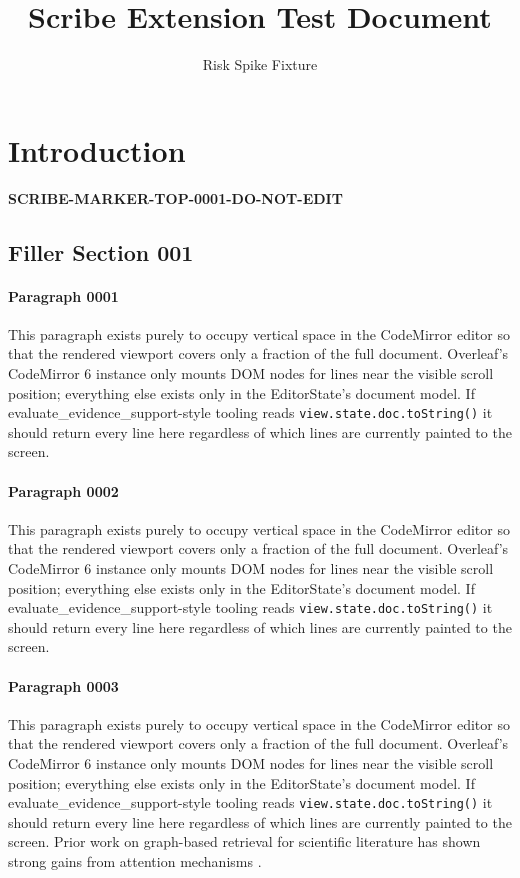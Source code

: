 \documentclass{article}
\title{Scribe Extension Test Document}
\author{Risk Spike Fixture}
\begin{document}
\maketitle

\section{Introduction}
\textbf{SCRIBE-MARKER-TOP-0001-DO-NOT-EDIT}

\subsection{Filler Section 001}
\paragraph{Paragraph 0001}
This paragraph exists purely to occupy vertical space in the CodeMirror editor so that the rendered viewport covers only a fraction of the full document. Overleaf's CodeMirror 6 instance only mounts DOM nodes for lines near the visible scroll position; everything else exists only in the EditorState's document model. If evaluate\_evidence\_support-style tooling reads \texttt{view.state.doc.toString()} it should return every line here regardless of which lines are currently painted to the screen.

\paragraph{Paragraph 0002}
This paragraph exists purely to occupy vertical space in the CodeMirror editor so that the rendered viewport covers only a fraction of the full document. Overleaf's CodeMirror 6 instance only mounts DOM nodes for lines near the visible scroll position; everything else exists only in the EditorState's document model. If evaluate\_evidence\_support-style tooling reads \texttt{view.state.doc.toString()} it should return every line here regardless of which lines are currently painted to the screen.

\paragraph{Paragraph 0003}
This paragraph exists purely to occupy vertical space in the CodeMirror editor so that the rendered viewport covers only a fraction of the full document. Overleaf's CodeMirror 6 instance only mounts DOM nodes for lines near the visible scroll position; everything else exists only in the EditorState's document model. If evaluate\_evidence\_support-style tooling reads \texttt{view.state.doc.toString()} it should return every line here regardless of which lines are currently painted to the screen. Prior work on graph-based retrieval for scientific literature has shown strong gains from attention mechanisms \citep{chen2019graphattn}.
\end{document}
